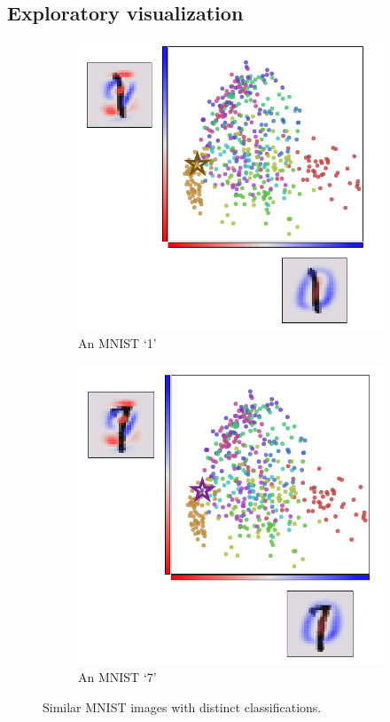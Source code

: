 \documentclass[english,a4paper,oneside]{amsart}
\theoremstyle{definition}
\begin{document}
\subsection{Exploratory visualization}
\begin{figure}
\centering
\begin{subfigure}{0.45\textwidth}
	\includegraphics[width=\textwidth]{images/PCA1.png}
	\caption{An MNIST `1'}
\end{subfigure}
\begin{subfigure}{0.45\textwidth}
	\includegraphics[width=\textwidth]{images/PCA7.png}
	\caption{An MNIST `7'}
\end{subfigure}
\caption{Similar MNIST images with distinct classifications.}\label{Fig:Similar}
\end{figure}
\end{document}
